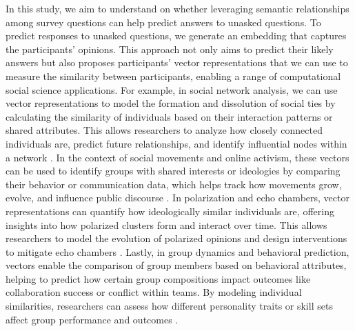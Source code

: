 In this study, we aim to understand on whether leveraging semantic relationships among survey questions can help predict answers to unasked questions. To predict responses to unasked questions, we generate an embedding that captures the participants' opinions. This approach not only aims to predict their likely answers but also proposes participants' vector representations that we can use to measure the similarity between participants, enabling a range of computational social science applications. For example, in social network analysis, we can use vector representations to model the formation and dissolution of social ties by calculating the similarity of individuals based on their interaction patterns or shared attributes. This allows researchers to analyze how closely connected individuals are, predict future relationships, and identify influential nodes within a network \cite{xu2023studying}. In the context of social movements and online activism, these vectors can be used to identify groups with shared interests or ideologies by comparing their behavior or communication data, which helps track how movements grow, evolve, and influence public discourse \cite{amro2023integrated}. In polarization and echo chambers, vector representations can quantify how ideologically similar individuals are, offering insights into how polarized clusters form and interact over time. This allows researchers to model the evolution of polarized opinions and design interventions to mitigate echo chambers \cite{baumann2020modeling}. Lastly, in group dynamics and behavioral prediction, vectors enable the comparison of group members based on behavioral attributes, helping to predict how certain group compositions impact outcomes like collaboration success or conflict within teams. By modeling individual similarities, researchers can assess how different personality traits or skill sets affect group performance and outcomes \cite{kelly2006protest}.
